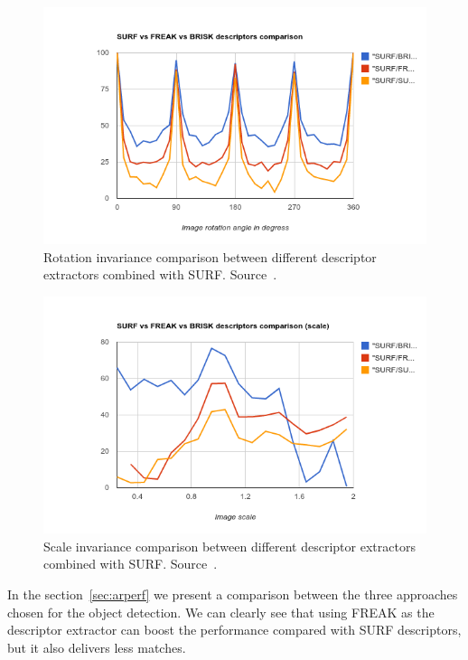 \begin{figure}
\centering
\includegraphics[scale=0.75]{img/rotation.png}
\caption{\label{fig:surfrotation} Rotation invariance comparison between different descriptor
  extractors combined with SURF. Source~\cite{rotationscaleinv}.}
\end{figure} 

\begin{figure}
\centering
\includegraphics[scale=0.75]{img/scale.png}
\caption{\label{fig:surfscale}Scale invariance comparison between different descriptor
  extractors combined with SURF. Source~\cite{rotationscaleinv}.}
\end{figure} 

In the section~\ref{sec:arperf} we present a comparison between the three
approaches chosen for the object detection. We can clearly see that using FREAK
as the descriptor extractor can boost the performance compared with SURF
descriptors, but it also delivers less matches.


